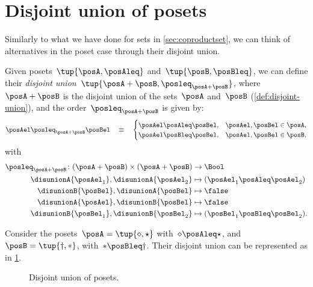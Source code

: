 
\section{Disjoint union of posets}
Similarly to what we have done for sets in \cref{sec:coproductset}, we can think of alternatives in the poset case through their disjoint union.

\begin{definition}
  Given posets~$\tup{\posA, \posAleq}$ and~$\tup{\posB, \posBleq}$, we can define their \emph{disjoint union}~$\tup{\posA + \posB, \posleq_{\posA + \posB}}$, where~$\posA + \posB$
  is the disjoint union of the sets~$\posA$ and~$\posB$ (\cref{def:disjoint-union}), and the
  order~$\posleq_{\posA + \posB}$ is given by:
  \begin{equation}
    \posAel \posleq_{\posA + \posB} \posBel \quad\equiv\quad
    \begin{cases}
      \posAel \posAleq \posBel, & \posAel,\posBel \in \posA, \\
      \posAel \posBleq \posBel, & \posAel,\posBel \in \posB,
    \end{cases}
  \end{equation}
  with
  \begin{equation}
    \begin{aligned}
      \posleq_{\posA+\posB}\colon (\posA+\posB)\times (\posA+\posB)&\to \Bool\\
      \disunionA{\posAel_1},\disunionA{\posAel_2}&\mapsto (\posAel_1\posAleq \posAel_2)\\
      \disunionB{\posBel},\disunionA{\posBel}&\mapsto \false\\
      \disunionA{\posAel},\disunionB{\posBel}&\mapsto \false\\
      \disunionB{\posBel_1},\disunionB{\posBel_2}&\mapsto (\posBel_1\posBleq \posBel_2).
    \end{aligned}
  \end{equation}
\end{definition}


\begin{example}
  Consider the posets~$\posA=\tup{\diamond, \star}$ with~$\diamond \posAleq \star$, and~$\posB=\tup{\dagger,\ast}$, with~$\ast \posBleq \dagger$. Their disjoint union can be represented as in \cref{fig:poset-coproduct}.

  \begin{figure}[h!]
    \centering
    \caption{Disjoint union of posets.}
    \label{fig:poset-coproduct}
  \end{figure}
\end{example}